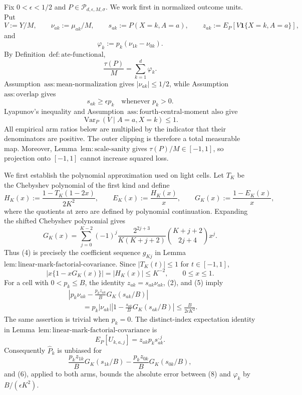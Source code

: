 Fix \(0<\epsilon<1/2\) and \(P\in\mathcal P_{d,\epsilon,M,\sigma}\).  We work first in normalized outcome units.  Put
\[
 V:=Y/M,\qquad \nu_{ak}:=\mu_{ak}/M,\qquad
 s_{ak}:=P(X=k,A=a),\qquad z_{ak}:=E_P[V\mathbf 1\{X=k,A=a\}],
\]
and
\[
 \varphi_k:=p_k(\nu_{1k}-\nu_{0k}).
\]
By Definition~\(\mathrm{def:ate\text{-}functional}\),
\[
 \frac{\tau(P)}M=\sum_{k=1}^d\varphi_k.                                      \tag{1}
\]
Assumption~\(\mathrm{ass:mean\text{-}normalization}\) gives \(|\nu_{ak}|\le1/2\), while Assumption~\(\mathrm{ass:overlap}\) gives
\[
 s_{ak}\ge\epsilon p_k\quad\text{whenever }p_k>0.                              \tag{2}
\]
Lyapunov's inequality and Assumption~\(\mathrm{ass:fourth\text{-}central\text{-}moment}\) also give
\[
 \operatorname{Var}_P(V\mid A=a,X=k)\le1.                                      \tag{3}
\]
All empirical arm ratios below are multiplied by the indicator that their denominators are positive.  The outer clipping is therefore a total measurable map.  Moreover, Lemma~\(\mathrm{lem:scale\text{-}sanity}\) gives \(\tau(P)/M\in[-1,1]\), so projection onto \([-1,1]\) cannot increase squared loss.

We first establish the polynomial approximation used on light cells.  Let \(T_K\) be the Chebyshev polynomial of the first kind and define
\[
 H_K(x):=\frac{1-T_K(1-2x)}{2K^2},\qquad
 E_K(x):=\frac{H_K(x)}x,\qquad
 G_K(x):=\frac{1-E_K(x)}x,
\]
where the quotients at zero are defined by polynomial continuation.  Expanding the shifted Chebyshev polynomial gives
\[
 G_K(x)=\sum_{j=0}^{K-2}(-1)^j
 \frac{2^{2j+3}}{K(K+j+2)}\binom{K+j+2}{2j+4}x^j.                              \tag{4}
\]
Thus (4) is precisely the coefficient sequence \(g_{Kj}\) in Lemma~\(\mathrm{lem:linear\text{-}mark\text{-}factorial\text{-}covariance}\).  Since \(|T_K(t)|\le1\) for \(t\in[-1,1]\),
\[
 \left|x\{1-xG_K(x)\}\right|=|H_K(x)|\le K^{-2},
 \qquad 0\le x\le1.                                                            \tag{5}
\]
For a cell with \(0<p_k\le B\), the identity \(z_{ak}=s_{ak}\nu_{ak}\), (2), and (5) imply
\[
 \begin{aligned}
 &\left|p_k\nu_{ak}-\frac{p_kz_{ak}}B G_K(s_{ak}/B)\right|\\
 &\qquad=p_k|\nu_{ak}|\left|1-\frac{s_{ak}}B G_K(s_{ak}/B)\right|
 \le \frac{B}{2\epsilon K^2}.
 \end{aligned}                                                                  \tag{6}
\]
The same assertion is trivial when \(p_k=0\).  The distinct-index expectation identity in Lemma~\(\mathrm{lem:linear\text{-}mark\text{-}factorial\text{-}covariance}\) is
\[
 E_P[U_{k,a,j}]=z_{ak}p_ks_{ak}^{,j}.                                           \tag{7}
\]
Consequently \(\widehat P_k\) is unbiased for
\[
 \frac{p_kz_{1k}}B G_K(s_{1k}/B)-
 \frac{p_kz_{0k}}B G_K(s_{0k}/B),                                               \tag{8}
\]
and (6), applied to both arms, bounds the absolute error between (8) and \(\varphi_k\) by \(B/(\epsilon K^2)\).

